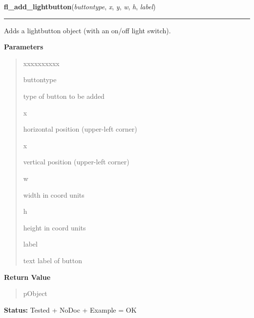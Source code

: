     \label{xformslib:library:fl_add_lightbutton}

    \vspace{0.5ex}

\hspace{.8\funcindent}\begin{boxedminipage}{\funcwidth}

    \raggedright \textbf{fl\_add\_lightbutton}(\textit{buttontype}, \textit{x}, \textit{y}, \textit{w}, \textit{h}, \textit{label})

    \vspace{-1.5ex}

    \rule{\textwidth}{0.5\fboxrule}
\setlength{\parskip}{2ex}
    Adds a lightbutton object (with an on/off light switch).

\setlength{\parskip}{1ex}
      \textbf{Parameters}
      \vspace{-1ex}

      \begin{quote}
        \begin{Ventry}{xxxxxxxxxx}

          \item[buttontype]

          type of button to be added

          \item[x]

          horizontal position (upper-left corner)

          \item[x]

          vertical position (upper-left corner)

          \item[w]

          width in coord units

          \item[h]

          height in coord units

          \item[label]

          text label of button

        \end{Ventry}

      \end{quote}

      \textbf{Return Value}
    \vspace{-1ex}

      \begin{quote}
      pObject

      \end{quote}

\textbf{Status:} Tested + NoDoc + Example = OK



    \end{boxedminipage}

